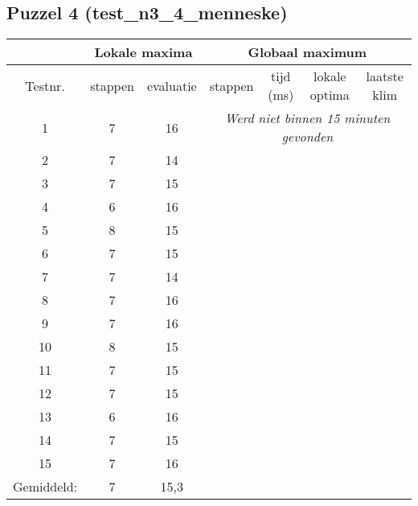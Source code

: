 \documentclass[]{report}
\begin{document}
\begin{appendices}
\subsection{Puzzel 4 (test\_n3\_4\_menneske)}
\begin{tabular}{|c||c|c||c|c|c|c|}
\hline  & \multicolumn{2}{|c||}{Lokale maxima} & \multicolumn{4}{|c|}{Globaal maximum}  \\ 
\hline Testnr. & stappen & evaluatie & stappen & tijd (ms) & lokale optima & laatste klim \\ 
\hline \hline	1	&	7	&	16	&	\multicolumn{4}{|c|}{\textit{Werd niet binnen 15 minuten gevonden}}	\\
\hline	2	&	7	&	14	&		&		&		&	\\
\hline	3	&	7	&	15	&		&		&		&	\\
\hline	4	&	6	&	16	&		&		&		&	\\
\hline	5	&	8	&	15	&		&		&		&	\\
\hline	6	&	7	&	15	&		&		&		&	\\
\hline	7	&	7	&	14	&		&		&		&	\\
\hline	8	&	7	&	16	&		&		&		&	\\
\hline	9	&	7	&	16	&		&		&		&	\\
\hline	10	&	8	&	15	&		&		&		&	\\
\hline	11	&	7	&	15	&		&		&		&	\\
\hline	12	&	7	&	15	&		&		&		&	\\
\hline	13	&	6	&	16	&		&		&		&	\\
\hline	14	&	7	&	15	&		&		&		&	\\
\hline	15	&	7	&	16	&		&		&		&	\\
\hline \hline Gemiddeld: & 7 & 15,3 &  &  &  &  \\ 
\hline 
\end{tabular}

\end{appendices}
\end{document}
